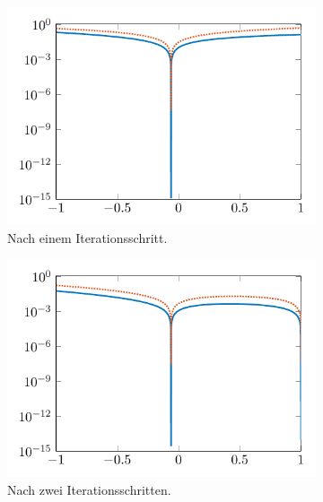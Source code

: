 \documentclass[../main.tex]{subfiles}
\begin{document}
\begin{figure}[tb]
    \centering
    \begin{subfigure}[b]{0.495\textwidth}
        \centering
        \includegraphics[width=1\textwidth]{figures/chapter5/ch5ex1_rbmerr_plot_1.pdf}
        \caption{Nach einem Iterationsschritt.}
    \end{subfigure}
    \begin{subfigure}[b]{0.495\textwidth}
        \centering
        \includegraphics[width=1\textwidth]{figures/chapter5/ch5ex1_rbmerr_plot_2.pdf}
        \caption{Nach zwei Iterationsschritten.}
    \end{subfigure}\\
    \begin{subfigure}[b]{0.495\textwidth}
        \centering

\end{subfigure}
\end{figure}
\end{document}
